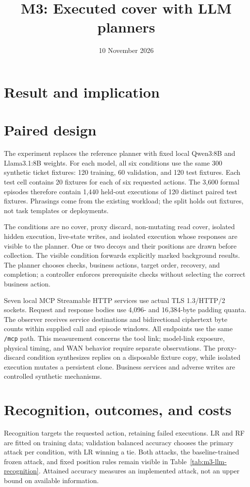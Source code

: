 \documentclass[10pt,a4paper]{article}
\title{M3: Executed cover with LLM planners}
\author{}
\date{10 November 2026}
\begin{document}
\maketitle
\vspace{-2em}
\section{Result and implication}


\section{Paired design}
The experiment replaces the reference planner with fixed local Qwen3:8B and
Llama3.1:8B weights. For each model, all six conditions use the same 300
synthetic ticket fixtures: 120 training, 60 validation, and 120 test fixtures.
Each test cell contains 20 fixtures for each of six requested actions.
The 3,600 formal episodes therefore contain 1,440 held-out executions of 120
distinct paired test fixtures. Phrasings come from the existing workload;
the split holds out fixtures, not task templates or deployments.

The conditions are no cover, proxy discard, non-mutating read cover,
isolated hidden execution, live-state writes, and isolated execution whose
responses are visible to the planner. One or two decoys and their positions
are drawn before collection. The visible condition forwards explicitly
marked background results. The planner chooses checks, business actions,
target order, recovery, and completion; a controller enforces prerequisite
checks without selecting the correct business action.

Seven local MCP Streamable HTTP services use actual TLS 1.3/HTTP/2 sockets.
Request and response bodies use 4,096- and 16,384-byte padding quanta.
The observer receives service destinations and bidirectional ciphertext
byte counts within supplied call and episode windows. All endpoints use
the same \texttt{/mcp} path. This measurement concerns the tool link;
model-link exposure, physical timing, and WAN behavior require separate
observations. The proxy-discard condition synthesizes replies on a disposable
fixture copy, while isolated execution mutates a persistent clone. Business
services and adverse writes are controlled synthetic mechanisms.

\section{Recognition, outcomes, and costs}
Recognition targets the requested action, retaining failed executions.
LR and RF are fitted on training data; validation balanced accuracy chooses
the primary attack per condition, with LR winning a tie. Both attacks, the
baseline-trained frozen attack, and fixed position rules remain visible in
Table~\ref{tab:m3-llm-recognition}. Attained accuracy measures an implemented
attack, not an upper bound on available information.
\end{document}
